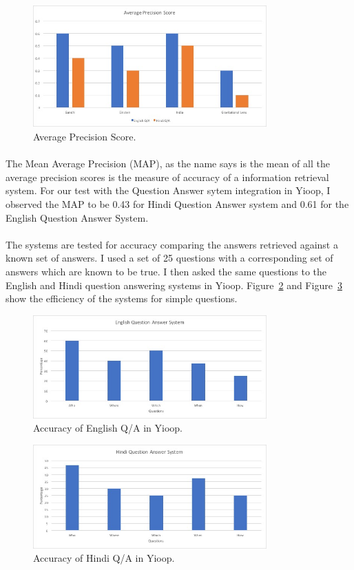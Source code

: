 \begin{figure}[htb]
\centering
\includegraphics[width=0.8\textwidth]{images/AveragePrecisionScore.jpg}
\caption{Average Precision Score.} 
\label{fig:AveragePrecisionScore}
\end{figure}

\paragraph{}
The Mean Average Precision (MAP), as the name says is the mean of all the average precision scores is the measure of accuracy of a information retrieval system. For our test with the Question Answer sytem integration in Yioop,  I observed the MAP to be 0.43 for Hindi Question Answer system and 0.61 for the English Question Answer System.

\paragraph{}
The systems are tested for accuracy comparing the answers retrieved against a known set of answers. I used a set of 25 questions with a corresponding set of answers which are known to be true. I then asked the same questions to the English and Hindi question answering systems in Yioop. Figure~\ref{fig:Accuracy_EnglishQA} and Figure~\ref{fig:Accuracy_HindiQA} show the efficiency of the systems for simple questions.

\begin{figure}[htb]
\centering
\includegraphics[width=0.8\textwidth]{images/Accuracy_EnglishQA.jpg}
\caption{Accuracy of English Q/A in Yioop.} 
\label{fig:Accuracy_EnglishQA}
\end{figure}

\begin{figure}[htb]
\centering
\includegraphics[width=0.8\textwidth]{images/Accuracy_HindiQA.jpg}
\caption{Accuracy of Hindi Q/A in Yioop.} 
\label{fig:Accuracy_HindiQA}
\end{figure}
